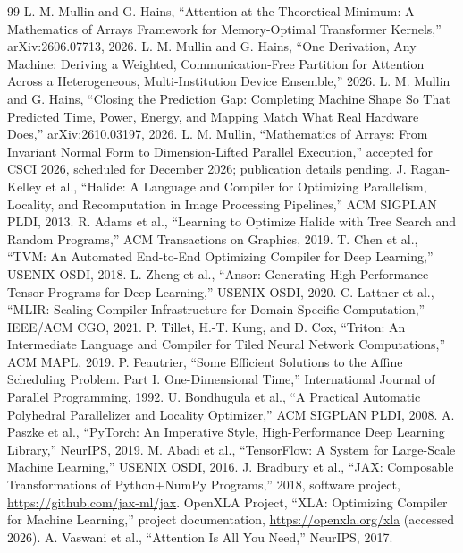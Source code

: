 \documentclass[11pt]{article}
\begin{document}
\begin{thebibliography}{99}
 L. M. Mullin and G. Hains, ``Attention at the Theoretical Minimum: A Mathematics of Arrays Framework for Memory-Optimal Transformer Kernels,'' arXiv:2606.07713, 2026.
 L. M. Mullin and G. Hains, ``One Derivation, Any Machine: Deriving a Weighted, Communication-Free Partition for Attention Across a Heterogeneous, Multi-Institution Device Ensemble,'' 2026.
 L. M. Mullin and G. Hains, ``Closing the Prediction Gap: Completing Machine Shape So That Predicted Time, Power, Energy, and Mapping Match What Real Hardware Does,'' arXiv:2610.03197, 2026.
 L. M. Mullin, ``Mathematics of Arrays: From Invariant Normal Form to Dimension-Lifted Parallel Execution,'' accepted for CSCI 2026, scheduled for December 2026; publication details pending.
 J. Ragan-Kelley et al., ``Halide: A Language and Compiler for Optimizing Parallelism, Locality, and Recomputation in Image Processing Pipelines,'' ACM SIGPLAN PLDI, 2013.
 R. Adams et al., ``Learning to Optimize Halide with Tree Search and Random Programs,'' ACM Transactions on Graphics, 2019.
 T. Chen et al., ``TVM: An Automated End-to-End Optimizing Compiler for Deep Learning,'' USENIX OSDI, 2018.
 L. Zheng et al., ``Ansor: Generating High-Performance Tensor Programs for Deep Learning,'' USENIX OSDI, 2020.
 C. Lattner et al., ``MLIR: Scaling Compiler Infrastructure for Domain Specific Computation,'' IEEE/ACM CGO, 2021.
 P. Tillet, H.-T. Kung, and D. Cox, ``Triton: An Intermediate Language and Compiler for Tiled Neural Network Computations,'' ACM MAPL, 2019.
 P. Feautrier, ``Some Efficient Solutions to the Affine Scheduling Problem. Part I. One-Dimensional Time,'' International Journal of Parallel Programming, 1992.
 U. Bondhugula et al., ``A Practical Automatic Polyhedral Parallelizer and Locality Optimizer,'' ACM SIGPLAN PLDI, 2008.
 A. Paszke et al., ``PyTorch: An Imperative Style, High-Performance Deep Learning Library,'' NeurIPS, 2019.
 M. Abadi et al., ``TensorFlow: A System for Large-Scale Machine Learning,'' USENIX OSDI, 2016.
 J. Bradbury et al., ``JAX: Composable Transformations of Python+NumPy Programs,'' 2018, software project, \url{https://github.com/jax-ml/jax}.
 OpenXLA Project, ``XLA: Optimizing Compiler for Machine Learning,'' project documentation, \url{https://openxla.org/xla} (accessed 2026).
 A. Vaswani et al., ``Attention Is All You Need,'' NeurIPS, 2017.

\end{thebibliography}
\end{document}

